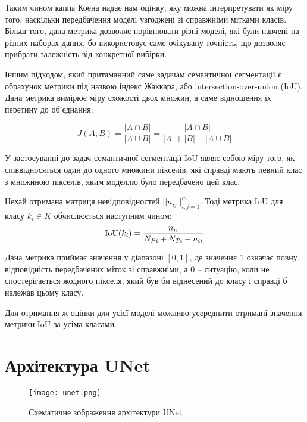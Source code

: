 Таким чином каппа Коена надає нам оцінку, яку можна інтерпретувати як
міру того, наскільки передбачення моделі узгоджені зі справжніми
мітками класів. Більш того, дана метрика дозволяє порівнювати різні моделі,
які були навчені на різних наборах даних, бо використовує саме
очікувану точність, що дозволяє прибрати залежність від конкретної вибірки.

Іншим підходом, який притаманний саме задачам семантичної сегментації
є обрахунок метрики під назвою індекс Жаккара, або intersection-over-union (IoU).
Дана метрика вимірює міру схожості двох множин, а саме відношення їх
перетину до об'єднання:

\begin{equation*}
    J(A, B) = \frac{|A \cap B|}{|A \cup B|} =
    \frac{|A \cap B|}{|A| + |B| - |A \cup B|}
\end{equation*}

У застосуванні до задач семантичної сегментації IoU являє собою
міру того, як співвідносяться один до одного множини пікселів,
які справді мають певний клас з множиною пікселів, яким моделлю
було передбачено цей клас.

\begin{definition}[IoU]\label{def:iou}
    Нехай отримана матриця невідповідностей $||n_{ij}||_{i,j=1}^m$.
    Тоді метрика IoU для класу $k_i \in K$ обчислюється наступним чином:
    \begin{equation*}
        \operatorname{IoU}(k_i) = \frac{n_{ii}}{N_{Pi} + N_{Ti} - n_{ii}}
    \end{equation*}
\end{definition}

Дана метрика приймає значення у діапазоні $[0, 1]$, де
значення $1$ означає повну відповідність передбачених міток
зі справжніми, а $0$ --  ситуацію, коли не спостерігається
жодного пікселя, який був би віднесений до класу і справді б
належав цьому класу.

Для отримання ж оцінки для усієї моделі можливо усереднити отримані
значення метрики IoU за усіма класами.

\section{Архітектура UNet}

\begin{figure}[!ht]
    \centering
    \texttt{[image: unet.png]}
    \caption{Схематичне зображення \cite{unet} архітектури  UNet}
    \label{fig:unet}
\end{figure}


